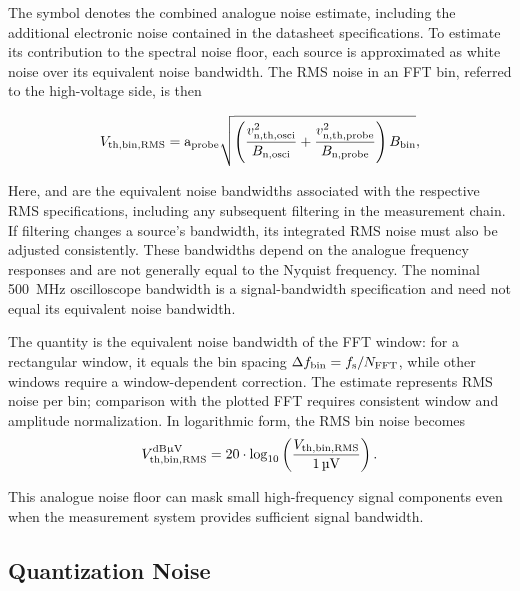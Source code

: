 The symbol  denotes the combined analogue noise estimate, including the additional electronic noise contained in the datasheet specifications.
To estimate its contribution to the spectral noise floor, each source is approximated as white noise over its equivalent noise bandwidth.
The RMS noise in an FFT bin, referred to the high-voltage side, is then

\begin{equation}
	{V}_{\mathrm{th,bin,RMS}} = \text{a}_{\text{probe}}\sqrt{
	\left(\frac{{v}_{\mathrm{n,th,osci}}^2}{{B}_{\mathrm{n,osci}}}
	+ \frac{{v}_{\mathrm{n,th,probe}}^2}{{B}_{\mathrm{n,probe}}}\right){B}_{\mathrm{bin}}},
	\label{eq:RMStoAmplitudePlot}
\end{equation}

Here,  and  are the equivalent noise bandwidths associated with the respective RMS specifications, including any subsequent filtering in the measurement chain.
If filtering changes a source's bandwidth, its integrated RMS noise must also be adjusted consistently.
These bandwidths depend on the analogue frequency responses and are not generally equal to the Nyquist frequency.
The nominal \SI{500}{MHz} oscilloscope bandwidth is a signal-bandwidth specification and need not equal its equivalent noise bandwidth.

The quantity  is the equivalent noise bandwidth of the FFT window: for a rectangular window, it equals the bin spacing $\Delta {f}_{\mathrm{bin}} = {f}_{\mathrm{s}}/{N}_{\mathrm{FFT}}$, while other windows require a window-dependent correction.
The estimate represents RMS noise per bin; comparison with the plotted FFT requires consistent window and amplitude normalization.
In logarithmic form, the RMS bin noise becomes
\begin{equation}
	{V}_{\mathrm{th,bin,RMS}}^{\mathrm{dB}\upmu\mathrm{V}} = 20 \cdot \log_{10}\left(\frac{{V}_{\mathrm{th,bin,RMS}}}{\SI{1}{\micro V}}\right).
\end{equation}

This analogue noise floor can mask small high-frequency signal components even when the measurement system provides sufficient signal bandwidth.









\subsection{Quantization Noise}
\label{sec:QuantNoise}

